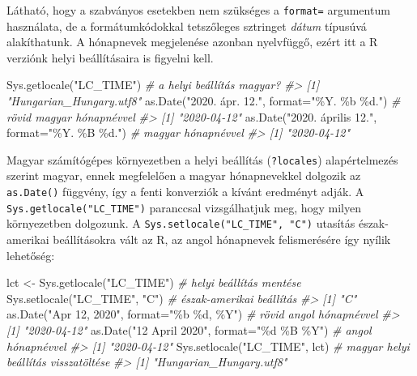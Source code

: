 \documentclass[
]{book}
\newenvironment{Shaded}{\begin{snugshade}}{\end{snugshade}}
\newcommand{\AttributeTok}[1]{\textcolor[rgb]{0.77,0.63,0.00}{#1}}
\newcommand{\CommentTok}[1]{\textcolor[rgb]{0.56,0.35,0.01}{\textit{#1}}}
\newcommand{\FunctionTok}[1]{\textcolor[rgb]{0.00,0.00,0.00}{#1}}
\newcommand{\NormalTok}[1]{#1}
\newcommand{\OtherTok}[1]{\textcolor[rgb]{0.56,0.35,0.01}{#1}}
\newcommand{\StringTok}[1]{\textcolor[rgb]{0.31,0.60,0.02}{#1}}
\begin{document}
Látható, hogy a szabványos esetekben nem szükséges a \texttt{format=} argumentum használata, de a formátumkódokkal tetszőleges sztringet \emph{dátum} típusúvá alakíthatunk. A hónapnevek megjelenése azonban nyelvfüggő, ezért itt a R verziónk helyi beállításaira is figyelni kell.

\begin{Shaded}
\begin{Highlighting}[]
\FunctionTok{Sys.getlocale}\NormalTok{(}\StringTok{"LC\_TIME"}\NormalTok{)                          }\CommentTok{\# a helyi beállítás magyar?}
\CommentTok{\#\textgreater{} [1] "Hungarian\_Hungary.utf8"}
\FunctionTok{as.Date}\NormalTok{(}\StringTok{"2020. ápr. 12."}\NormalTok{, }\AttributeTok{format=}\StringTok{"\%Y. \%b \%d."}\NormalTok{)    }\CommentTok{\# rövid magyar hónapnévvel}
\CommentTok{\#\textgreater{} [1] "2020{-}04{-}12"}
\FunctionTok{as.Date}\NormalTok{(}\StringTok{"2020. április 12."}\NormalTok{, }\AttributeTok{format=}\StringTok{"\%Y. \%B \%d."}\NormalTok{) }\CommentTok{\# magyar hónapnévvel}
\CommentTok{\#\textgreater{} [1] "2020{-}04{-}12"}
\end{Highlighting}
\end{Shaded}

Magyar számítógépes környezetben a helyi beállítás (\texttt{?locales}) alapértelmezés szerint magyar, ennek megfelelően a magyar hónapnevekkel dolgozik az \texttt{as.Date()} függvény, így a fenti konverziók a kívánt eredményt adják. A \texttt{Sys.getlocale("LC\_TIME")} paranccsal vizsgálhatjuk meg, hogy milyen környezetben dolgozunk. A \texttt{Sys.setlocale("LC\_TIME",\ "C")} utasítás észak-amerikai beállításokra vált az R, az angol hónapnevek felismerésére így nyílik lehetőség:

\begin{Shaded}
\begin{Highlighting}[]
\NormalTok{lct }\OtherTok{\textless{}{-}} \FunctionTok{Sys.getlocale}\NormalTok{(}\StringTok{"LC\_TIME"}\NormalTok{)                   }\CommentTok{\# helyi beállítás mentése}
\FunctionTok{Sys.setlocale}\NormalTok{(}\StringTok{"LC\_TIME"}\NormalTok{, }\StringTok{"C"}\NormalTok{)                     }\CommentTok{\# észak{-}amerikai beállítás }
\CommentTok{\#\textgreater{} [1] "C"}
\FunctionTok{as.Date}\NormalTok{(}\StringTok{"Apr 12, 2020"}\NormalTok{, }\AttributeTok{format=}\StringTok{"\%b \%d, \%Y"}\NormalTok{)       }\CommentTok{\# rövid angol hónapnévvel}
\CommentTok{\#\textgreater{} [1] "2020{-}04{-}12"}
\FunctionTok{as.Date}\NormalTok{(}\StringTok{"12 April 2020"}\NormalTok{, }\AttributeTok{format=}\StringTok{"\%d \%B \%Y"}\NormalTok{)       }\CommentTok{\# angol hónapnévvel}
\CommentTok{\#\textgreater{} [1] "2020{-}04{-}12"}
\FunctionTok{Sys.setlocale}\NormalTok{(}\StringTok{"LC\_TIME"}\NormalTok{, lct)  }\CommentTok{\# magyar helyi beállítás visszatöltése  }
\CommentTok{\#\textgreater{} [1] "Hungarian\_Hungary.utf8"}
\end{Highlighting}
\end{Shaded}
\end{document}
